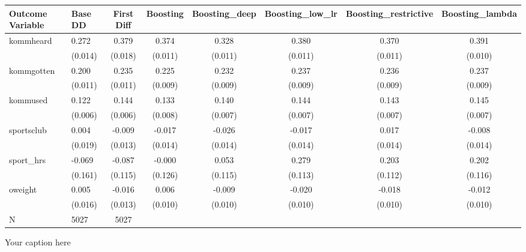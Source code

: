 \begin{adjustbox}{angle=90}
\begin{tabular}{llcccccc}
\hline
Outcome Variable & Base DD & First Diff & Boosting & Boosting_deep & Boosting_low_lr & Boosting_restrictive & Boosting_lambda \\
\hline
kommheard & 0.272 & 0.379 & 0.374 & 0.328 & 0.380 & 0.370 & 0.391 \\
  & (0.014) & (0.018) & (0.011) & (0.011) & (0.011) & (0.011) & (0.010) \\
kommgotten & 0.200 & 0.235 & 0.225 & 0.232 & 0.237 & 0.236 & 0.237 \\
  & (0.011) & (0.011) & (0.009) & (0.009) & (0.009) & (0.009) & (0.009) \\
kommused & 0.122 & 0.144 & 0.133 & 0.140 & 0.144 & 0.143 & 0.145 \\
  & (0.006) & (0.006) & (0.008) & (0.007) & (0.007) & (0.007) & (0.007) \\
sportsclub & 0.004 & -0.009 & -0.017 & -0.026 & -0.017 & 0.017 & -0.008 \\
  & (0.019) & (0.013) & (0.014) & (0.014) & (0.014) & (0.014) & (0.014) \\
sport_hrs & -0.069 & -0.087 & -0.000 & 0.053 & 0.279 & 0.203 & 0.202 \\
  & (0.161) & (0.115) & (0.126) & (0.115) & (0.113) & (0.112) & (0.116) \\
oweight & 0.005 & -0.016 & 0.006 & -0.009 & -0.020 & -0.018 & -0.012 \\
  & (0.016) & (0.013) & (0.010) & (0.010) & (0.010) & (0.010) & (0.010) \\
\hline
N & 5027 & 5027  &  &  &  &  \\
\hline
\end{tabular}
\caption{Your caption here}
\label{tab:your_label}
\end{adjustbox}
